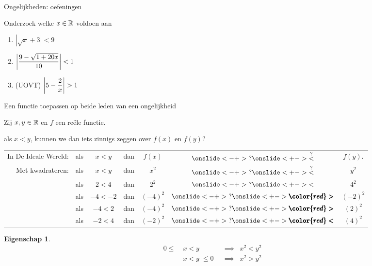\documentclass{beamer}
\theoremstyle{eigenschap}
\newtheorem{proposition}{Eigenschap}
\providecommand{\p}{\pause}
\providecommand{\redgt}{\mathbin{\pmb{\color{red}>}}}
\providecommand{\redlt}{\mathbin{\pmb{\color{red}<}}}
\begin{document}
\begin{frame}{Ongelijkheden: oefeningen}
       
Onderzoek welke $x\in \mathbb{R}$ voldoen aan
        
\begin{enumerate}      
\item $|\sqrt{x}+3|<9$
\item $\displaystyle \left|  \frac{9 - \sqrt{1+20x}}{10} \right| < 1$
\item (UOVT) $\ds \left|5-\frac{2}{x}\right|>1$
\end{enumerate}

\end{frame}

\begin{frame}{Een functie toepassen op beide leden van een ongelijkheid}

Zij $x,y\in\mathbb{R}$ en $f$ een reële functie.

\begin{problem}
     als $x<y$, kunnen we dan iets zinnigs zeggen over $f(x)$ en $f(y)$?
\end{problem}

\begin{tabular}{rrclccc}
\p In De Ideale Wereld:& als & $x<y$   &dan &  
           $f(x)$ & $\onslide<-+>{?}\onslide<+->{\overset{?}{<}}$ & $f(y)$.\\
\p Met kwadrateren:    & als & $x<y$   &dan & 
            $x^2$ & $\onslide<-+>{?}\onslide<+->{\overset{?}{<}}$ & $y^2$ \\
\p                     & als & $2<4$   &dan &  
            $2^2$ & $\onslide<-+>{?}\onslide<+->{<}$ & $4^2$ \\
\p                     & als & $-4<-2$ &dan &  
            $(-4)^2$ & $\onslide<-+>{?}\onslide<+->{\redgt}$ & $(-2)^2$ \\
\p                     & als & $-4<2$  &dan &  
            $(-4)^2$ & $\onslide<-+>{?}\onslide<+->{\redgt}$ & $(2)^2$ \\
\p                     & als & $-2<4$  &dan &  
            $(-2)^2$ & $\onslide<-+>{?}\onslide<+->{\redlt}$ & $(4)^2$
\end{tabular}

\p
\begin{proposition}
\setlength{\abovedisplayskip}{-5pt}
\begin{align}
 0\leq &\;x<y         &&\implies &x^2<y^2 \\
       &\;x<y\;\leq 0 &&\implies &x^2>y^2 %
\end{align}
\end{proposition}
\end{frame}
\end{document}
